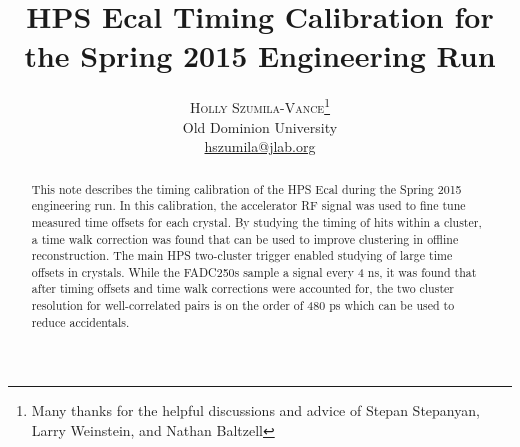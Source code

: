 \documentclass[twoside]{article}
\title{\vspace{-15mm}\fontsize{24pt}{10pt}\selectfont\textbf{HPS Ecal Timing Calibration for the Spring 2015 Engineering Run}} %
\author{
\large
\textsc{Holly Szumila-Vance}\thanks{Many thanks for the helpful discussions and advice of Stepan Stepanyan, Larry Weinstein, and Nathan Baltzell}\\[2mm] %
\normalsize Old Dominion University\\ %
\normalsize \href{mailto:hszumila@jlab.org}{hszumila@jlab.org} %
\vspace{-5mm}
}
\date{}
\begin{document}
\maketitle %

\thispagestyle{fancy} %


\begin{abstract}

\noindent %
This note describes the timing calibration of the HPS Ecal during the Spring 2015 engineering run. In this calibration, the accelerator RF signal was used to fine tune measured time offsets for each crystal. By studying the timing of hits within a cluster, a time walk correction was found that can be used to improve clustering in offline reconstruction. The main HPS two-cluster trigger enabled studying of large time offsets in crystals. While the FADC250s sample a signal every 4 ns, it was found that after timing offsets and time walk corrections were accounted for, the two cluster resolution for well-correlated pairs is on the order of 480 ps which can be used to reduce accidentals. 

\end{abstract}

\end{document}

